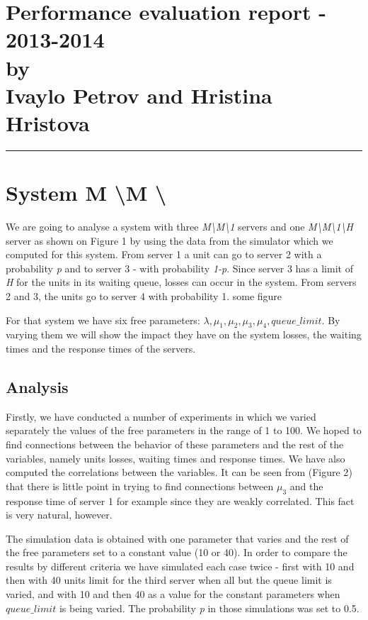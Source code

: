 \documentclass[12pt]{article}
\newcommand{\hr}{\rule{\linewidth}{0.1mm}}
\theoremstyle{plain}
\begin{document}
\section*{\centering
  Performance evaluation report - 2013-2014 \\
  by\\
  Ivaylo Petrov and Hristina Hristova 
}

\hr
\section*{\textbf{System M \textbackslash M \textbackslash *}}

We are going to analyse a system with three \emph{M\textbackslash M\textbackslash 1}
servers and one \emph{M\textbackslash M\textbackslash 1\textbackslash H} server
as shown on {\color{red}Figure 1} by using the data from the simulator which we computed
for this system. From server 1 a unit can go to server 2 with a probability
\emph{p} and to server 3 - with probability \emph{1-p}. Since server 3 has a
limit of \emph{H} for the units in its waiting queue, losses can occur in the
system. From servers 2 and 3, the units go to server 4 with probability 1.
{\color{red}some figure} 

For that system we have six free parameters: $\lambda, \mu_1, \mu_2, \mu_3, \mu_4,
queue\_limit$. By varying them we will show the impact they have on the system
losses, the waiting times and the response times of the servers.

\subsection*{Analysis}

Firstly, we have conducted a number of experiments in which we varied separately the values of
the free parameters in the range of 1 to 100. We hoped to find connections
between the behavior of these parameters and the rest of the variables,
namely units losses, waiting times and response times. We have
also computed the correlations between the variables. It can be seen from
({\color{red}Figure 2}) that there is little point in trying to find connections
between $\mu_3$ and the response time of server 1 for example since they are
weakly correlated. This fact is very natural, however.

The simulation data is obtained with one parameter that varies and the rest of
the free parameters set to a constant value (10 or 40). In order to compare the results by
different criteria we have simulated each case twice - first with 10 and then with 40
units limit for the third server when all but the queue limit is varied, and with
10 and then 40 as a value for the constant parameters when $queue\_limit$ is
being varied. The probability \emph{p} in those simulations was set to 0.5.
\end{document}
